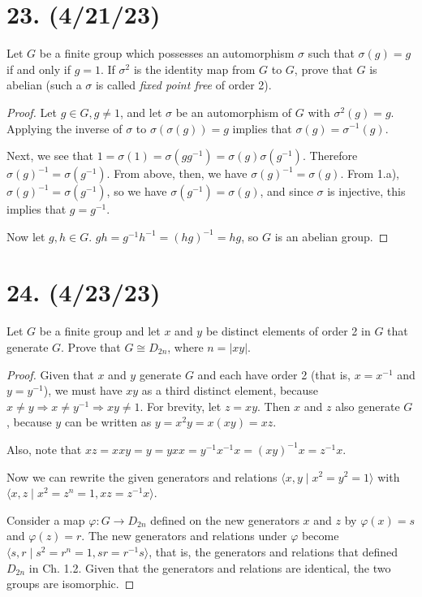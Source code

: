 \documentclass{article}
\begin{document}
\section*{23. (4/21/23)}

Let $G$ be a finite group which possesses an automorphism $\sigma$ such that $\sigma(g) = g$ if and only if $g = 1$. If $\sigma^2$ is the identity map from $G$ to $G$, prove that $G$ is abelian (such a $\sigma$ is called \emph{fixed point free} of order 2).

\begin{proof}
    Let $g \in G, g \neq 1$, and let $\sigma$ be an automorphism of $G$ with $\sigma^2(g) = g$. Applying the inverse of $\sigma$ to $\sigma(\sigma(g)) = g$ implies that $\sigma(g) = \sigma^{-1}(g)$.

    Next, we see that $1 = \sigma(1) = \sigma(g g^{-1}) = \sigma(g) \sigma(g^{-1})$. Therefore $\sigma(g)^{-1} = \sigma(g^{-1})$. From above, then, we have $\sigma(g)^{-1} = \sigma(g)$. From 1.a), $\sigma(g)^{-1} = \sigma(g^{-1})$, so we have $\sigma(g^{-1}) = \sigma(g)$, and since $\sigma$ is injective, this implies that $g = g^{-1}$.

    Now let $g, h \in G$. $gh = g^{-1}h^{-1} = (hg)^{-1} = hg$, so $G$ is an abelian group.
\end{proof}

\section*{24. (4/23/23)}

Let $G$ be a finite group and let $x$ and $y$ be distinct elements of order 2 in $G$ that generate $G$. Prove that $G \cong D_{2n}$, where $n = |xy|$.

\begin{proof}
    Given that $x$ and $y$ generate $G$ and each have order 2 (that is, $x = x^{-1}$ and $y = y^{-1}$), we must have $xy$ as a third distinct element, because $x \neq y \Rightarrow x \neq y^{-1} \Rightarrow xy \neq 1$. For brevity, let $z = xy$. Then $x$ and $z$ also generate $G$, because $y$ can be written as $y = x^2y = x(xy) = xz$.

    Also, note that $xz = xxy = y = yxx = y^{-1}x^{-1}x = (xy)^{-1}x = z^{-1}x$.

    Now we can rewrite the given generators and relations $\langle x, y \mid x^2 = y^2 = 1 \rangle$ with $\langle x, z \mid x^2 = z^n = 1, xz = z^{-1}x \rangle$.

    Consider a map $\varphi: G \rightarrow D_{2n}$ defined on the new generators $x$ and $z$ by $\varphi(x) = s$ and $\varphi(z) = r$. The new generators and relations under $\varphi$ become $\langle s, r \mid s^2 = r^n = 1, sr = r^{-1}s \rangle$, that is, the generators and relations that defined $D_{2n}$ in Ch. 1.2. Given that the generators and relations are identical, the two groups are isomorphic.
\end{proof}
\end{document}
